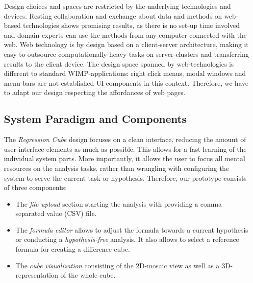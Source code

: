 \documentclass[journal]{style/vgtc} 			          %
\newcommand{\com}[1]{\textcolor{orange}{\uline{#1}}}
\begin{document}
\noindent Design choices and spaces are restricted by the underlying technologies and devices.
Resting collaboration and exchange about data and methods on web-based technologies shows promising results, as there is no set-up time involved and domain experts can use the methods from any computer connected with the web.
Web technology is by design based on a client-server architecture, making it easy to outsource computationally heavy tasks on server-clusters and transferring results to the client device.
The design space spanned by web-technologies is different to standard WIMP-applications: right click menus, modal windows and menu bars are not established UI components in this context.
Therefore, we have to adapt our design respecting the affordances of web pages.
\subsection{System Paradigm and Components}
The \emph{Regression Cube} design focuses on a clean interface, reducing the amount of user-interface elements as much as possible.
This allows for a fast learning of the individual system parts.
More importantly, it allows the user to focus all mental resources on the analysis tasks, rather than wrangling with configuring the system to serve the current task or hypothesis.
Therefore, our prototype consists of three components:
\begin{itemize}
	\item The \emph{file upload} section starting the analysis with providing a comma separated value (CSV) file.
	\item The \emph{formula editor} allows to adjust the formula towards a current hypothesis or conducting a \emph{hypothesis-free} analysis.
	It also allows to select a reference formula for creating a difference-cube.
	\item The \emph{cube visualization} consisting of the 2D-mosaic view as well as a 3D-representation of the whole cube.
\end{itemize}
\end{document}
